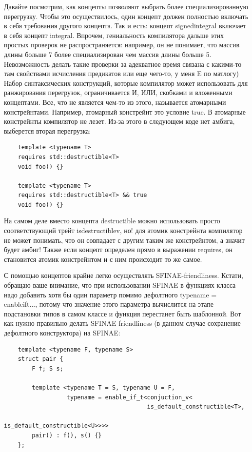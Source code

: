 \documentclass[12pt, a4paper]{article}
\begin{document}
\par Давайте посмотрим, как концепты позволяют выбрать более специализированную перегрузку. Чтобы это осуществилось, один концепт должен полностью включать в себя требования другого концепта. Так и есть: концепт signed\textunderscore integral включает в себя концепт integral. Впрочем, гениальность компилятора дальше этих простых проверок не распространяется: например, он не понимает, что массив длины больше 7 более специализирован чем массив длины больше 5. Невозможность делать такие проверки за адекватное время связана с какими-то там свойствами исчисления предикатов или еще чего-то, у меня E по матлогу) Набор синтаксических конструкций, которые компилятор может использовать для ранжирования перегрузок, ограничивается И, ИЛИ, скобками и вложенными концептами. Все, что не является чем-то из этого, называется атомарными констрейнтами. Например, атомарный констрейнт это условие true. В атомарные констрейнты компилятор не лезет. Из-за этого в следующем коде нет амбига, выберется вторая перегрузка:
\begin{verbatim}
	template <typename T>
	requires std::destructible<T>
	void foo() {}
	
	template <typename T>
	requires std::destructible<T> && true
	void foo() {}
\end{verbatim}
На самом деле вместо концепта destructible можно использовать просто соответствующий трейт is\textunderscore destructible\textunderscore v, но! для атомик констрейнта компилятор не может понимать, что он совпадает с другим таким же констрейнтом, а значит будет амбиг! Также если концепт определен прямо в выражении requires, он становится атомик констрейнтом и с ним происходит то же самое.
\par С помощью концептов крайне легко осуществлять SFINAE-friendliness. Кстати, обращаю ваше внимание, что при использовании SFINAE в функциях класса надо добавить хотя бы один параметр помимо дефолтного typename = enable\textunderscore if\textunderscore t..., потому что значение этого параметра вычислится на этапе подстановки типов в самом классе и функция перестанет быть шаблонной. Вот как нужно правильно делать SFINAE-friendliness (в данном случае сохранение дефолтного конструктора) на SFINAE:
\begin{verbatim}
	template <typename F, typename S>
	struct pair {
		F f; S s;
		
		template <typename T = S, typename U = F,
				  typename = enable_if_t<conjuction_v<
										 is_default_constructible<T>,
										 is_default_constructible<U>>>>
		pair() : f(), s() {}
	};
\end{verbatim}
\end{document}
